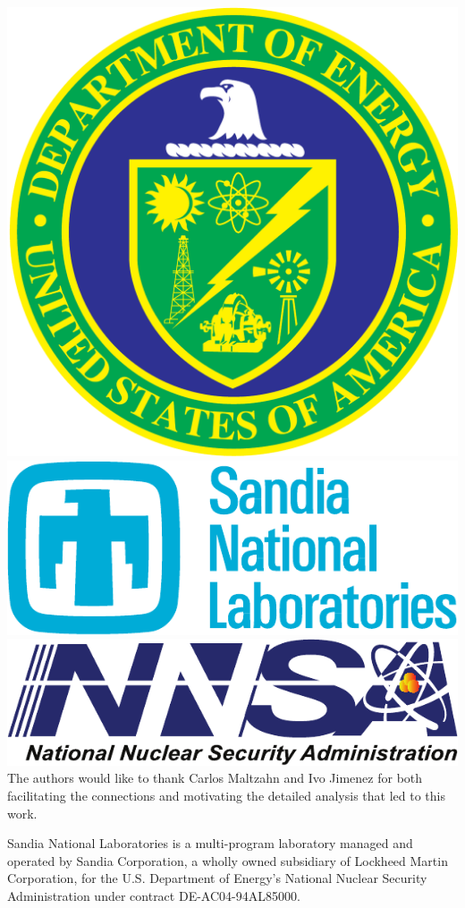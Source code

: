 \documentclass{sig-alt-gov2}
\begin{document}
\includegraphics[scale=0.07]{logos/doe_logo}
\includegraphics[scale=0.30]{logos/snl_logo}
\includegraphics[scale=0.35]{logos/nnsa_logo}
The authors would like to thank Carlos Maltzahn and Ivo Jimenez for both
facilitating the connections and motivating the detailed analysis that led to
this work.

Sandia National Laboratories is a multi-program laboratory managed and operated
by Sandia Corporation, a wholly owned subsidiary of Lockheed Martin
Corporation, for the U.S. Department of Energy's National Nuclear Security
Administration under contract DE-AC04-94AL85000.




\vfill\eject
\end{document}

